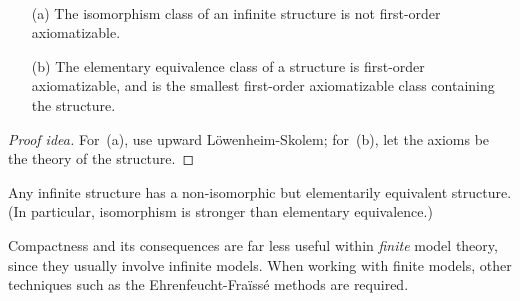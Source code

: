 \begin{thm}
\ 
\begin{enumerate}[itemsep=0pt]
\item[(a)] The isomorphism class of an infinite structure is not first-order axiomatizable.
\item[(b)] The elementary equivalence class of a structure is first-order axiomatizable, and is the smallest first-order axiomatizable class containing the structure.
\end{enumerate}
\end{thm}
\begin{proof}[Proof idea]
For~(a), use upward L\"owenheim-Skolem; for~(b), let the axioms be the theory of the structure.
\end{proof}
\begin{cor}
Any infinite structure has a non-isomorphic but elementarily equivalent structure. (In particular, isomorphism is stronger than elementary equivalence.)
\end{cor}

\begin{rmk}
Compactness and its consequences are far less useful within \emph{finite} model theory, since they usually involve infinite models. When working with finite models, other techniques such as the Ehrenfeucht-Fra\"iss\'e methods are required.
\end{rmk}
